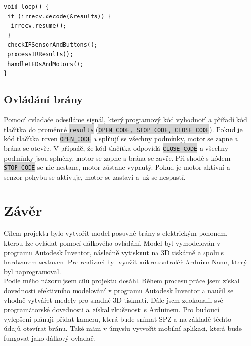 \documentclass[12pt, a4paper, twoside]{report}
\newcommand{\code}[1]{\colorbox{lightgray}{\texttt{#1}}}
\begin{document}
	
\begin{lstlisting}[style=c++]
void loop() {
 if (irrecv.decode(&results)) {
  irrecv.resume();
 }
 checkIRSensorAndButtons();
 processIRResults();
 handleLEDsAndMotors();
}
\end{lstlisting}
	
	\section{Ovládání brány}
	\noindent Pomocí ovladače odesíláme signál, který programový kód vyhodnotí a přiřadí kód tlačítka do proměnné \code{results} (\code{OPEN\_CODE, STOP\_CODE, CLOSE\_CODE}). Pokud je kód tlačítka roven \code{OPEN\_CODE} a splňují se všechny podmínky, motor se zapne a brána se otevře. V případě, že kód tlačítka odpovídá \code{CLOSE\_CODE} a všechny podmínky jsou splněny, motor se zapne a brána se zavře. Při shodě s kódem \code{STOP\_CODE} se nic nestane, motor zůstane vypnutý. Pokud je motor aktivní a senzor pohybu se aktivuje, motor se zastaví a~už se nespustí. \\
	
	
	\newpage
	
	\chapter*{Závěr}
	
	\noindent Cílem projektu bylo vytvořit model posuvné brány s elektrickým pohonem, kterou lze ovládat pomocí dálkového ovládání. Model byl vymodelován v programu Autodesk Inventor, následně vytisknut na 3D tiskárně a spolu s hardwarem sestaven. Pro realizaci byl využit mikrokontroléř Arduino Nano, který byl naprogramoval. \\
	
	\noindent Podle mého názoru jsem cílů projektu dosáhl. Během procesu práce jsem získal dovednosti efektivního modelování v programu Autodesk Inventor a naučil se vhodně vytvářet modely pro snadné 3D tisknutí. Dále jsem zdokonalil své programátorské dovednosti a~získal zkušenosti s Arduinem. Pro budoucí vylepšení plánuji přidat kameru, která bude snímat SPZ a na základě těchto údajů otevírat bránu. Také mám v úmyslu vytvořit mobilní aplikaci, která bude fungovat jako dálkový ovladač. \\
		
\end{document}
